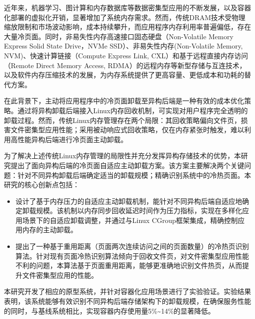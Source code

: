 
\begin{chineseabstract}

近年来，机器学习、图计算和内存数据库等数据密集型应用的不断发展，以及容器化部署的虚拟化开销，显著增加了系统内存需求。然而，传统DRAM技术受物理缩放限制和市场波动影响，成本持续攀升，而应用程序内存利用率普遍偏低，存在大量冷页面。同时，非易失性内存高速接口固态硬盘（Non-Volatile Memory Express Solid State Drive，NVMe SSD）、非易失性内存(Non-Volatile Memory, NVM)、快速计算链接（Compute Express Link, CXL）和基于远程直接内存访问（Remote Direct Memory Access, RDMA）的远程内存等新型存储与互连技术，以及软件内存压缩技术的发展，为内存系统提供了更高容量、更低成本和功耗的替代方案。

在此背景下，主动将应用程序中的冷页面卸载至异构后端是一种有效的成本优化策略。通过将异构卸载后端接入Linux内存回收机制，可实现对用户程序完全透明的卸载过程。然而，传统Linux内存管理存在两个局限：其回收策略偏向文件页，损害文件密集型应用性能；采用被动响应式回收策略，仅在内存紧张时触发，难以利用高性能异构后端进行冷页面主动卸载。

为了解决上述传统Linux内存管理的局限性并充分发挥异构存储技术的优势，本研究提出了面向异构后端的冷页面自适应主动卸载方案。该方案主要解决两个关键问题：针对不同异构卸载后端确定适当的卸载规模；精确识别系统中的冷热页面。本研究的核心创新点包括：
\begin{itemize}
    \item 设计了基于内存压力的自适应主动卸载机制，能针对不同异构后端自适应地确定卸载规模。该机制以内存同步回收延迟时间作为压力指标，实现在多样化应用场景下的自适应卸载调整，并通过与Linux CGroup框架集成，精确控制应用内存的主动卸载。
    \item 提出了一种基于重用距离（页面两次连续访问之间的页面数量）的冷热页识别算法。针对现有页面冷热识别算法倾向于回收文件页，对文件密集型应用性能不利的问题，本算法基于页面重用距离，能够更准确地识别文件热页，从而提升文件密集型应用的性能。
\end{itemize}

本研究开发了相应的原型系统，并针对容器化应用场景进行了实验验证。实验结果表明，该系统能够有效识别不同异构后端存储架构下的卸载规模，在确保服务性能的同时，与基线系统相比，实现容器内存使用量5\%\~{}14\%的显著降低。

\end{chineseabstract}